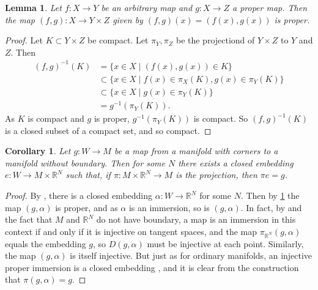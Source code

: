 \documentclass[12pt]{article}
\theoremstyle{plain}
\newtheorem{corollary}[theorem]{Corollary}
\newtheorem{lemma}[theorem]{Lemma}
\theoremstyle{definition}
\theoremstyle{remark}
\newcommand{\R}{\mathbb{R}}
\begin{document}
\begin{lemma}\label{L: proper product}
	Let $f \colon X \to Y$ be an arbitrary map and $g \colon X \to Z$ a proper map. 
	Then the map $(f,g) \colon X \to Y \times Z$ given by $(f,g)(x)=(f(x),g(x))$ is proper.
\end{lemma}
\begin{proof}
	Let $K \subset Y \times Z$ be compact. 
	Let $\pi_Y,\pi_Z$ be the projectiond of $Y \times Z$ to $Y$ and $Z$. Then 
	\begin{align*}
		(f,g)^{-1}(K) &= \{x \in X \mid (f(x),g(x)) \in K \}\\
		&\subset \{ x \in X \mid f(x) \in \pi_X(K), g(x) \in \pi_Y(K)\}\\
		&\subset \{ x \in X \mid g(x) \in \pi_Y(K)\}\\
		&= g^{-1}(\pi_Y(K)).
	\end{align*} 
	As $K$ is compact and $g$ is proper, $g^{-1}(\pi_Y(K))$ is compact. 
	So $(f,g)^{-1}(K)$ is a closed subset of a compact set, and so compact.
\end{proof}

\begin{corollary}\label{C: embed V}
Let $g \colon W \to M$ be a map from a manifold with corners to a manifold without boundary. 
Then for some $N$ there exists a closed embedding $e \colon W \to M \times \R^N$ such that, if $\pi \colon M \times \R^N \to M$ is the projection, then $\pi e = g$. 
\end{corollary}
\begin{proof}
By \cite[Corollary 11.3.10]{MaDo92}, there is a closed embedding $\alpha \colon W \to \R^N$ for some $N$. 
Then by \cref{L: proper product} the map $(g,\alpha)$ is proper, and as $\alpha$ is an immersion, so is $(g,\alpha)$.
In fact, by \cite[Theorem 3.2.6]{MaDo92} and the fact that $M$ and $\R^N$ do not have boundary, a map is an immersion in this context if and only if it is injective on tangent spaces, and the map $\pi_{\R^N}(g,\alpha)$ equals the embedding $g$, so $D(g,\alpha)$ must be injective at each point.
Similarly, the map $(g,\alpha)$ is itself  injective.  
But just as for ordinary manifolds, an injective proper immersion is a closed embedding \cite[Proposition 3.3.4]{MaDo92}, and it is clear from the construction that $\pi (g,\alpha) = g$.
\end{proof}
\end{document}
